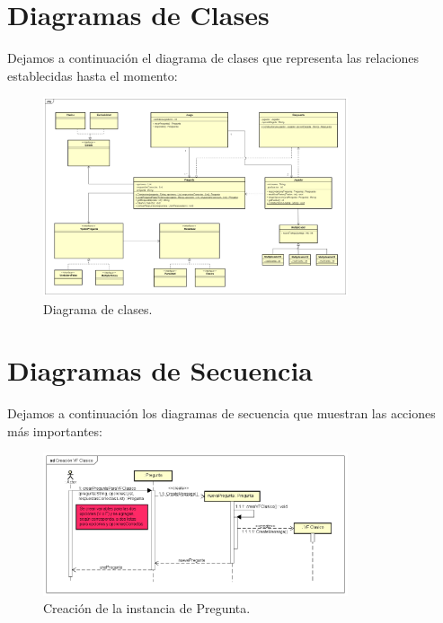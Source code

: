 \documentclass[titlepage,a4paper]{article}
\begin{document}
\section{Diagramas de Clases}\label{sec:diagramasdeclase}

Dejamos a continuación el diagrama de clases que representa las relaciones establecidas hasta el momento:

\begin{figure}[H]
\centering
\includegraphics[width=0.8\textwidth]{img/UMLClases1.png}
\caption{\label{fig:class01}Diagrama de clases.}
\end{figure}

\section{Diagramas de Secuencia}

Dejamos a continuación los diagramas de secuencia que muestran las acciones más importantes:

\begin{figure}[H]
\centering
\includegraphics[width=0.8\textwidth]{img/UMLSeq2.png}
\caption{\label{fig:class01}Creación de la instancia de Pregunta.}
\end{figure}
\end{document}
